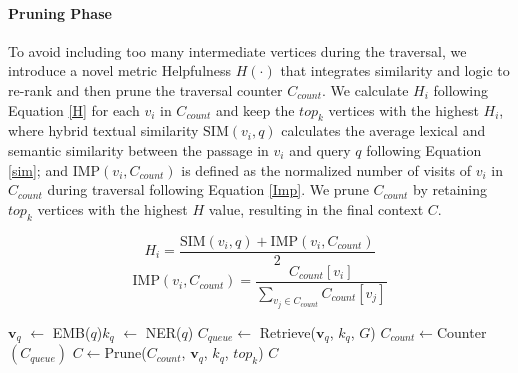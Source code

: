 \paragraph{Pruning Phase} To avoid including too many intermediate vertices during the traversal, we introduce a novel metric Helpfulness $H(\cdot)$  that integrates similarity and logic to re-rank and then prune the traversal counter $C_{count}$. We calculate $H_i$ following Equation \ref{H} for each $v_i$ in $C_{count}$ and keep the $top_k$ vertices with the highest $H_i$, where hybrid textual similarity $\text{SIM}(v_i, q)$ calculates the average lexical and semantic similarity between the passage in $v
_i$ and query $q$ following Equation \ref{sim}; and $\text{IMP}(v_i,C_{count})$ is defined as the normalized number of visits of $v_i$ in $C_{count}$ during traversal following Equation \ref{Imp}. We prune \( C_{count} \) by retaining $top_k$ vertices with the highest \( H \) value, resulting in the final context \( C \).

\begin{equation}
    H_i=\frac{\text{SIM}(v_i, q)+\text{IMP}(v_i,C_{count})}{2}
    \label{H}
\end{equation}
\begin{equation}
    \text{IMP}(v_i, C_{count}) = \frac{C_{count}[v_i]}{\sum_{v_j \in C_{count}} C_{count}[v_j]}
    \label{Imp}
\end{equation}
\begin{algorithm}
  \SetAlgoLined
 $\mathbf{v}_{q}$ $\leftarrow$ EMB($q$)\;$  k_{q}$ $\leftarrow$ NER($q$)\;
  $C_{queue}\leftarrow$ Retrieve($\mathbf{v}_{q}$, $k_{q}$, $G$)\;
  $C_{count}\leftarrow $Counter$(C_{queue})$\;
  $C\leftarrow$Prune($C_{count}$, $\mathbf{v}_{q}$, $k_q$, $top_k$)\;
  \Return $C$
  \caption{Reasoning-Augmented Graph Traversal}
  \label{ragt}
\end{algorithm}
